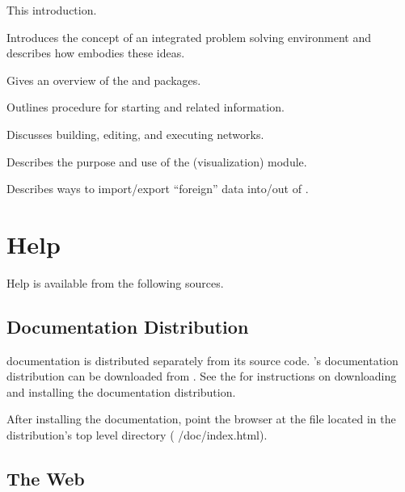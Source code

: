 \begin{description}
   This introduction.
  
   Introduces the concept of
  an integrated problem solving environment and describes how \SR{}
  embodies these ideas.
  
   Gives an overview
  of the \sr{} and \biopse{} packages.
  
   Outlines procedure
  for starting \sr{} and related information.

  Discusses building, editing, and executing
  networks.

  Describes the purpose and use of the \viewer{} (visualization) module.

  Describes ways to import/export ``foreign'' data into/out of \SR{}.
\end{description}

\section{Help}
\label{sec:help}

Help is available from the following sources.

\subsection{Documentation Distribution}

\sr{} documentation is distributed separately from its source code.
\sr{}'s documentation distribution can be downloaded from
.  See the 
for instructions on downloading and installing the documentation
distribution.

After installing the documentation, point the browser at the
 file located in the distribution's top level
 directory (\ie{} /doc/index.html).

\subsection{The Web}

